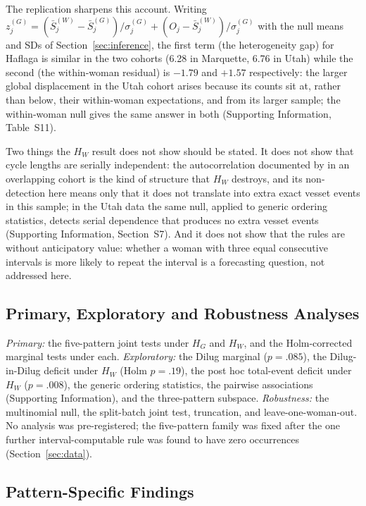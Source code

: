 \documentclass[12pt]{article}
\newcommand{\HG}{H_{G}}
\newcommand{\HW}{H_{W}}
\begin{document}
The replication sharpens this account. Writing $z_j^{(G)} = (\bar S_j^{(W)} -
\bar S_j^{(G)})/\sigma_j^{(G)} + (O_j - \bar S_j^{(W)})/\sigma_j^{(G)}$ with the null
means and SDs of Section~\ref{sec:inference}, the first term (the heterogeneity gap) for
Haflaga is similar in the two cohorts (6.28 in Marquette, 6.76 in Utah) while the second
(the within-woman residual) is $-1.79$ and $+1.57$ respectively: the larger
global displacement in the Utah cohort arises because its counts sit at, rather than
below, their within-woman expectations, and from its larger sample; the within-woman null
gives the same answer in both (Supporting Information, Table~S11).

Two things the $\HW$ result does not show should be stated. It does not show that cycle
lengths are serially independent: the autocorrelation documented by \citet{ecochard2024}
in an overlapping cohort is the kind of structure that $\HW$ destroys, and its
non-detection here means only that it does not translate into extra exact vesset events
in this sample; in the Utah data the same null, applied to generic ordering statistics,
detects serial dependence that produces no extra vesset events (Supporting Information,
Section~S7). And it does not show that the rules are without anticipatory value:
whether a woman with three equal consecutive intervals is more likely to repeat the
interval is a forecasting question, not addressed here.

\subsection{Primary, Exploratory and Robustness Analyses}

\emph{Primary:} the five-pattern joint tests under $\HG$ and $\HW$, and the Holm-corrected
marginal tests under each. \emph{Exploratory:} the Dilug marginal ($p = .085$), the
Dilug-in-Dilug deficit under $\HW$ (Holm $p = .19$), the post hoc total-event deficit
under $\HW$ ($p = .008$), the generic ordering statistics, the pairwise associations
(Supporting Information), and the three-pattern subspace. \emph{Robustness:} the multinomial null, the split-batch joint
test, truncation, and leave-one-woman-out. No analysis was pre-registered; the
five-pattern family was fixed after the one further interval-computable rule was found
to have zero occurrences (Section~\ref{sec:data}).

\subsection{Pattern-Specific Findings}
\end{document}
